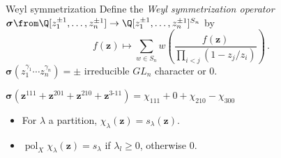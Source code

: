 \documentclass[dvipsnames]{beamer}
\newcommand{\zz}{{\boldsymbol z}}
\newcommand{\sigmabold}{\boldsymbol \sigma}
\DeclareMathOperator{\pol}{pol}
\newcommand{\sgn}{\text{\rm sgn}}
\DeclareMathOperator{\sort}{sort}
\theoremstyle{definition}
\newcounter{c}
\begin{document}
  
\begin{frame}{Weyl symmetrization}
 Define the \emph{Weyl symmetrization operator} \(\sigmabold \from
 \Q[z_1^{\pm 1},\ldots, z_n^{\pm 1}] \to \Q[z_1^{\pm 1},\ldots,
 z_n^{\pm 1}]^{S_n}\) by 
 \[
   f(\zz) \mapsto \sum_{w \in S_n} w\left( \frac{f(\zz)}{\prod_{i < j}
     (1-z_j/z_i)} \right) \,.
 \]
 \pause
 \(\sigmabold(z_1^{\gamma_1} \cdots z_n^{\gamma_n}) = \pm \)
 irreducible \(GL_n\) character or \(0\).
 \pause
 \begin{example}
   \(\sigmabold(\zz^{111}+\zz^{201}+\zz^{210}+\zz^{3\text{-}11}) =
   \chi_{111}+0+\chi_{210}-\chi_{300}\)
 \end{example}\pause
 \begin{itemize}
 \item For \(\lambda\) a partition,
   \(\chi_\lambda(\zz) = s_\lambda(\zz)\).\pause
 \item \(\pol_X \chi_\lambda(\zz) = s_\lambda\) if \(\lambda_l \geq 0\),
   otherwise \(0\).
 \end{itemize}
\end{frame}
\end{document}
